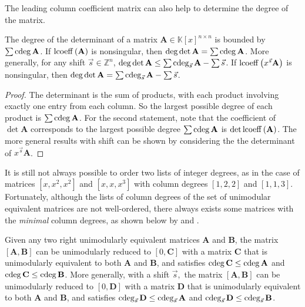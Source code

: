 The leading column coefficient matrix can also help to determine the
degree of the matrix.
\begin{lem}
\label{lem:fullRankLeadingCoefficientAndDegreeOfDetermant}The degree
of the determinant of a matrix $\mathbf{A}\in\mathbb{K}\left[x\right]^{n\times n}$
is bounded by $\sum\cdeg\mathbf{A}$. If $\operatorname{lcoeff}\left(\mathbf{A}\right)$
is nonsingular, then $\deg\det\mathbf{A}=\sum\cdeg\mathbf{A}$. More
generally, for any shift $\vec{s}\in\mathbb{Z}^{n}$, $\deg\det\mathbf{A}\le\sum\cdeg_{\vec{s}}\mathbf{A}-\sum\vec{s}$.
If $\operatorname{lcoeff}\left(x^{\vec{s}}\mathbf{A}\right)$ is nonsingular, then
$\deg\det\mathbf{A}=\sum\cdeg_{\vec{s}}\mathbf{A}-\sum\vec{s}$.\end{lem}
\begin{proof}
The determinant is the sum of products, with each product involving
exactly one entry from each column. So the largest possible degree
of each product is $\sum\cdeg\mathbf{A}$. For the second statement,
note that the coefficient of $\det\mathbf{A}$ corresponds to the
largest possible degree $\sum\cdeg\mathbf{A}$ is $\det\operatorname{lcoeff}\left(\mathbf{A}\right)$.
The more general results with shift can be shown by considering the
the determinant of $x^{\vec{s}}\mathbf{A}$.
\end{proof}
It is still not always possible to order two lists of integer degrees,
as in the case of matrices $\left[x,x^{2},x^{2}\right]$ and $\left[x,x,x^{3}\right]$
with column degrees $\left[1,2,2\right]$ and $\left[1,1,3\right]$.
Fortunately, although the lists of column degrees of the set of unimodular
equivalent matrices are not well-ordered, there always exists some
matrices with the \emph{minimal} column degrees, as shown below by
 and .
\begin{lem}
\label{lem:matrixGCDlowerDegrees}Given any two right unimodularly
equivalent matrices $\mathbf{A}$ and $\mathbf{B}$, the matrix $\left[\mathbf{A},\mathbf{B}\right]$
can be unimodularly reduced to $\left[0,\mathbf{C}\right]$ with a
matrix $\mathbf{C}$ that is unimodularly equivalent to both $\mathbf{A}$
and $\mathbf{B}$, and satisfies $\cdeg\mathbf{C}\le\cdeg\mathbf{A}$
and $\cdeg\mathbf{C}\le\cdeg\mathbf{B}$. More generally, with a shift
$\vec{s},$ the matrix $\left[\mathbf{A},\mathbf{B}\right]$ can be
unimodularly reduced to $\left[0,\mathbf{D}\right]$ with a matrix
$\mathbf{D}$ that is unimodularly equivalent to both $\mathbf{A}$
and $\mathbf{B}$, and satisfies $\cdeg_{\vec{s}}\mathbf{D}\le\cdeg_{\vec{s}}\mathbf{A}$
and $\cdeg_{\vec{s}}\mathbf{D}\le\cdeg_{\vec{s}}\mathbf{B}$. \end{lem}
